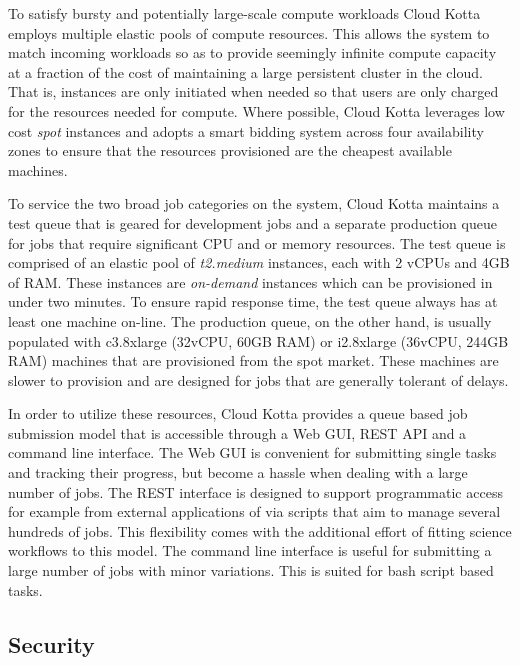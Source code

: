 To satisfy bursty and potentially large-scale compute workloads
Cloud Kotta employs multiple elastic pools of compute resources. 
This allows the system to match incoming workloads so as to
provide seemingly infinite compute capacity at a fraction of the 
cost of maintaining a large persistent cluster in the cloud. 
That is, instances are only initiated when needed so that users are only charged for the resources needed for compute.
Where possible, Cloud Kotta leverages low cost \emph{spot} instances
and adopts a smart bidding system across four availability zones to ensure
that the resources provisioned are the cheapest available machines. %

To service the two broad job categories on the system, Cloud Kotta maintains a test queue that is geared
for development jobs and a separate production queue for jobs that require significant CPU and or memory resources.
The test queue is comprised of an elastic pool of \emph{t2.medium} instances, each with 2 vCPUs and 4GB of RAM. These instances
are \emph{on-demand} instances which can be provisioned in under two minutes. 
To ensure rapid response time, the test 
queue always has at least one machine on-line. The production queue, on the other hand, is usually populated with c3.8xlarge
(32vCPU, 60GB RAM) or i2.8xlarge (36vCPU, 244GB RAM) machines that are provisioned from the spot market.
These machines are slower to provision and are designed for jobs that are generally tolerant of delays.

In order to utilize these resources, Cloud Kotta provides a queue based job submission model that is accessible
through a Web GUI, REST API and a command line interface. The Web GUI is convenient for submitting single tasks
and tracking their progress, but become a hassle when dealing with a large number of jobs. The REST interface
is designed to support programmatic access for example from external applications of via scripts that aim to manage several hundreds of jobs. This
flexibility comes with the additional effort of fitting science workflows to this model. The command line
interface is useful for submitting a large number of jobs with minor variations. This is suited for bash
script based tasks. %

\subsection{Security}

